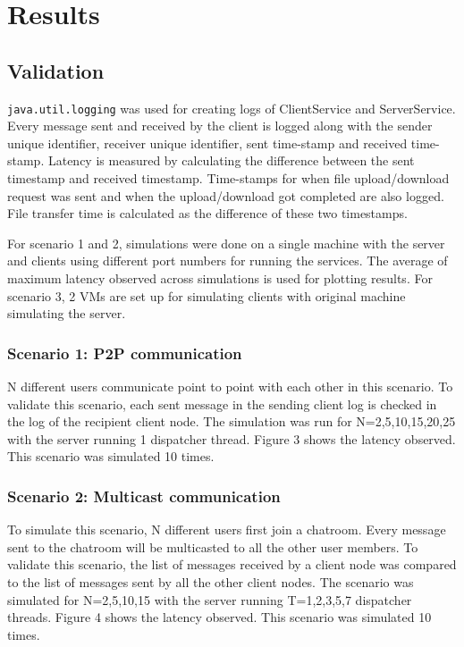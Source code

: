 \documentclass[a4paper,10pt]{article}
\begin{document}
\section{Results}
\subsection{Validation}
\texttt{java.util.logging} was used for creating logs of ClientService and ServerService. Every message sent and received by the client is logged along with the sender unique identifier, receiver unique identifier, sent time-stamp and received time-stamp. Latency is measured by calculating the difference between the sent timestamp and received timestamp. Time-stamps for when file upload/download request was sent and when the upload/download got completed are also logged. File transfer time is calculated as the difference of these two timestamps. \par For scenario 1 and 2, simulations were done on a single machine with the server and clients using different port numbers for running the services. The average of maximum latency observed across simulations is used for plotting results. For scenario 3, 2 VMs are set up for simulating clients with original machine simulating the server. 

\subsubsection{Scenario 1: P2P communication}
N different users communicate point to point with each other in this scenario. To validate this scenario, each sent message in the sending client log is checked in the log of the recipient client node.
The simulation was run for N=2,5,10,15,20,25 with the server running 1 dispatcher thread. Figure 3 shows the latency observed. This scenario was simulated 10 times.

\subsubsection{Scenario 2: Multicast communication}
To simulate this scenario, N different users first join a chatroom. Every message sent to the chatroom will be multicasted to all the other user members. To validate this scenario, the list of messages received by a client node was compared to the list of messages sent by all the other client nodes. The scenario was simulated for N=2,5,10,15 with the server running T=1,2,3,5,7 dispatcher threads. Figure 4 shows the latency observed. This scenario was simulated 10 times.
\end{document}
